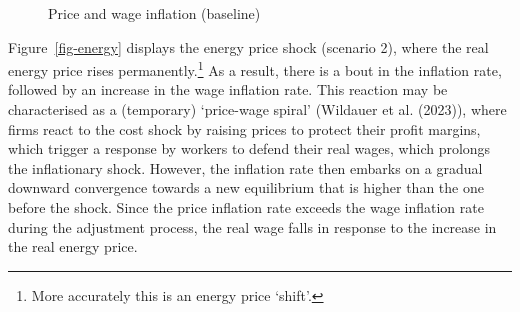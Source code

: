 \documentclass[
  letterpaper,
  DIV=11,
  numbers=noendperiod]{scrreprt}
\begin{document}
\begin{figure}[H]


\caption{\label{fig-baseline-inflation}Price and wage inflation
(baseline)}

\end{figure}%

Figure~\ref{fig-energy} displays the energy price shock (scenario 2),
where the real energy price rises permanently.\footnote{More accurately
  this is an energy price `shift'.} As a result, there is a bout in the
inflation rate, followed by an increase in the wage inflation rate. This
reaction may be characterised as a (temporary) `price-wage spiral'
(Wildauer et al. (2023)), where firms react to the cost shock by raising
prices to protect their profit margins, which trigger a response by
workers to defend their real wages, which prolongs the inflationary
shock. However, the inflation rate then embarks on a gradual downward
convergence towards a new equilibrium that is higher than the one before
the shock. Since the price inflation rate exceeds the wage inflation
rate during the adjustment process, the real wage falls in response to
the increase in the real energy price.
\end{document}
